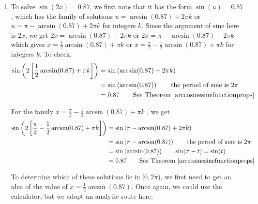 {\begin{enumerate}

\item To solve $\sin(2x) = 0.87$, we first note that it has the form $\sin(u) = 0.87$, which has the family of solutions $u = \arcsin(0.87) + 2\pi k$ or $u =\pi -  \arcsin(0.87) + 2\pi k$ for integers $k$. Since the argument of sine here is $2x$, we get $2x = \arcsin(0.87) + 2\pi k$ or $2x =\pi -  \arcsin(0.87) + 2\pi k$ which gives $x = \frac{1}{2} \arcsin(0.87) + \pi k$ or $x =\frac{\pi}{2} -  \frac{1}{2}\arcsin(0.87) + \pi k$ for integers $k$.  To check,
\begin{align*}
\sin\left(2\left[\frac{1}{2} \arcsin(0.87) + \pi k\right]\right)  &  =  \sin\left(\arcsin(0.87) + 2\pi k\right)   \\
		& =   \sin\left(\arcsin(0.87)\right)  \tag*{the period of sine is $2\pi$} \\
        & =   0.87 \tag*{See Theorem \ref{arccosinesinefunctionprops}}
\end{align*}

For the family $x =\frac{\pi}{2} -  \frac{1}{2}\arcsin(0.87) + \pi k$ , we get
\begin{align*}
\sin\left(2\left[\frac{\pi}{2} - \frac{1}{2} \arcsin(0.87) + \pi k\right]\right)  &  =  \sin\left(\pi - \arcsin(0.87) + 2\pi k\right) \\			& =   \sin\left(\pi - \arcsin(0.87)\right)  \tag*{the period of sine is $2\pi$} \\
	& =   \sin\left(\arcsin(0.87)\right)  \tag*{$\sin(\pi - t) = \sin(t)$} \\
	& =  0.87 \tag*{See Theorem  \ref{arccosinesinefunctionprops}}
\end{align*}

\drawexampleline

To determine which of these solutions lie in $[0,2\pi)$, we first need to get an idea of the value of $x=\frac{1}{2} \arcsin(0.87)$.  Once again, we could use the calculator, but we adopt an analytic route here.  


\end{enumerate}}
